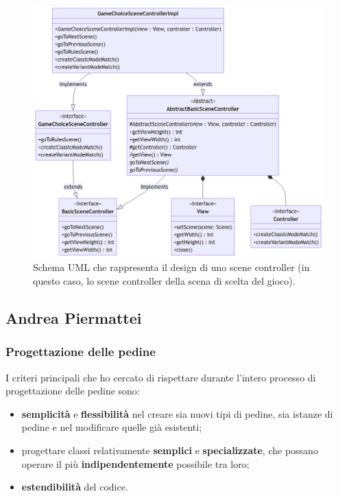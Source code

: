 \documentclass[a4paper,12pt]{report}
\begin{document}
\begin{figure}[H]
\centering
\includegraphics[width=\textwidth]{images/game-choice-scene-controller.png}
\caption{Schema UML che rappresenta il design di uno scene controller (in questo caso, lo scene controller della scena di scelta del gioco).}
\label{images:game-choice-scene-controller}
\end{figure}

\subsection{Andrea Piermattei}
\subsubsection{Progettazione delle pedine}
I criteri principali che ho cercato di rispettare durante l'intero processo di progettazione delle pedine sono:
\begin{itemize}
\item \textbf{semplicità} e \textbf{flessibilità} nel creare sia nuovi tipi di pedine, sia istanze di pedine e nel modificare quelle già esistenti;
\item progettare classi relativamente \textbf{semplici} e \textbf{specializzate}, che possano operare il più \textbf{indipendentemente} possibile tra loro;
\item \textbf{estendibilità} del codice.
\end{itemize}
\end{document}
